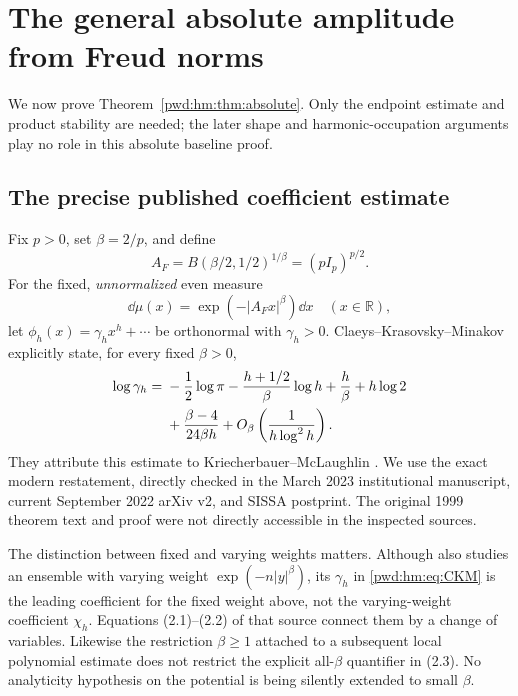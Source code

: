 \documentclass[11pt,letterpaper]{article}
\numberwithin{equation}{section}
\theoremstyle{remark}\newtheorem{remark}[theorem]{Remark}
\begin{document}
\section{The general absolute amplitude from Freud norms}\label{pwd:hm:sec:freud}
We now prove Theorem~\ref{pwd:hm:thm:absolute}. Only the endpoint estimate and product stability are needed; the later shape and harmonic-occupation arguments play no role in this absolute baseline proof.

\subsection{The precise published coefficient estimate}
Fix $p>0$, set $\beta=2/p$, and define
\begin{equation}\label{pwd:hm:eq:Freud-scale}
 A_F=B(\beta/2,1/2)^{1/\beta}=(pI_p)^{p/2}.
\end{equation}
For the fixed, \emph{unnormalized} even measure
\[
 \dd\mu(x)=\exp(-|A_Fx|^\beta)\dd x\quad(x\in\mathbb R),
\]
let $\phi_h(x)=\gamma_hx^h+\cdots$ be orthonormal with $\gamma_h>0$. Claeys--Krasovsky--Minakov \cite[Section 2, Eq. (2.3)]{ckm} explicitly state, for every fixed $\beta>0$,
\begin{align}\label{pwd:hm:eq:CKM}
 \log\gamma_h={}&-\frac12\log\pi
 -\frac{h+1/2}{\beta}\log h+\frac h\beta+h\log2\notag\\
 &+\frac{\beta-4}{24\beta h}
 +O_\beta\left(\frac1{h\log^2h}\right).
\end{align}
They attribute this estimate to Kriecherbauer--McLaughlin \cite[Theorem 1.5]{km}. We use the exact modern restatement, directly checked in the March 2023 institutional manuscript, current September 2022 arXiv v2, and SISSA postprint. The original 1999 theorem text and proof were not directly accessible in the inspected sources.

The distinction between fixed and varying weights matters. Although \cite{ckm} also studies an ensemble with varying weight $\exp(-n|y|^\beta)$, its $\gamma_h$ in \eqref{pwd:hm:eq:CKM} is the leading coefficient for the fixed weight above, not the varying-weight coefficient $\chi_h$. Equations (2.1)--(2.2) of that source connect them by a change of variables. Likewise the restriction $\beta\ge1$ attached to a subsequent local polynomial estimate does not restrict the explicit all-$\beta$ quantifier in (2.3). No analyticity hypothesis on the potential is being silently extended to small $\beta$.
\end{document}
